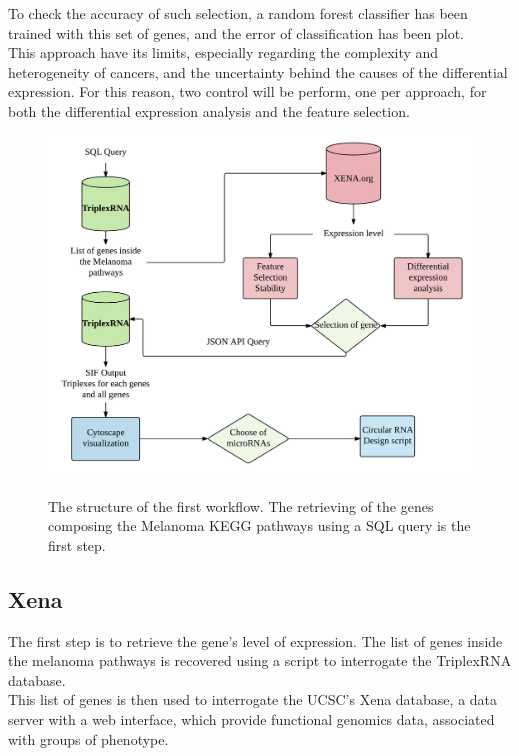 \documentclass[a4paper,12pt]{report}
\begin{document}
To check the accuracy of such selection, a random forest classifier \cite{springer} has been trained with this set of genes, and the error of classification has been plot.\\

This approach have its limits, especially regarding the complexity and heterogeneity of cancers\cite{TGCA, complexity}, and the uncertainty behind the causes of the differential expression. For this reason, two control will be perform, one per approach, for both the differential expression analysis and the feature selection.


\begin{figure}[H]
	\centering
	{\includegraphics[width=1\textwidth]{Workflow1.png}}
	\caption{The structure of the first workflow. The retrieving of the genes composing the Melanoma KEGG pathways using a SQL query is the first step.}
\end{figure}

\subsection{Xena}

The first step is to retrieve the gene's level of expression. The list of genes inside the melanoma pathways is recovered using a script to interrogate the TriplexRNA database.\\

This list of genes is then used to interrogate the UCSC's Xena database\cite{Xena}, a data server with a web interface, which provide functional genomics data, associated with groups of phenotype.\\
\end{document}
